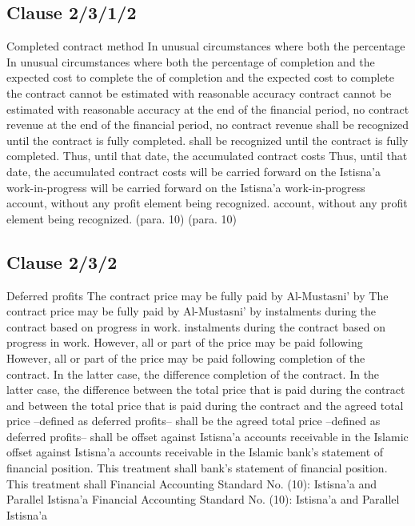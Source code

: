 \documentclass{article}%
\begin{document}
%
\subsection{Clause 2/3/1/2}%
\label{subsec:Clause2/3/1/2}%
Completed contract method   In unusual circumstances where both the percentage    In unusual circumstances where both the percentage  of completion and the expected cost to complete the  of completion and the expected cost to complete the  contract cannot be estimated with reasonable accuracy  contract cannot be estimated with reasonable accuracy  at the end of the financial period, no contract revenue  at the end of the financial period, no contract revenue  shall be recognized until the contract is fully completed.  shall be recognized until the contract is fully completed.  Thus, until that date, the accumulated contract costs  Thus, until that date, the accumulated contract costs  will be carried forward on the Istisna’a work-in-progress  will be carried forward on the Istisna’a work-in-progress  account, without any profit element being recognized.  account, without any profit element being recognized.  (para. 10) (para. 10)

%
\subsection{Clause 2/3/2}%
\label{subsec:Clause2/3/2}%
Deferred profits   The contract price may be fully paid by Al-Mustasni’ by    The contract price may be fully paid by Al-Mustasni’ by  instalments during the contract based on progress in work.  instalments during the contract based on progress in work.  However, all or part of the price may be paid following  However, all or part of the price may be paid following  completion of the contract. In the latter case, the difference  completion of the contract. In the latter case, the difference  between the total price that is paid during the contract and  between the total price that is paid during the contract and  the agreed total price –defined as deferred profits– shall be  the agreed total price –defined as deferred profits– shall be  offset against Istisna’a accounts receivable in the Islamic  offset against Istisna’a accounts receivable in the Islamic  bank’s statement of financial position. This treatment shall  bank’s statement of financial position. This treatment shall  Financial Accounting Standard No. (10): Istisna’a and Parallel Istisna’a Financial Accounting Standard No. (10): Istisna’a and Parallel Istisna’a
\end{document}
